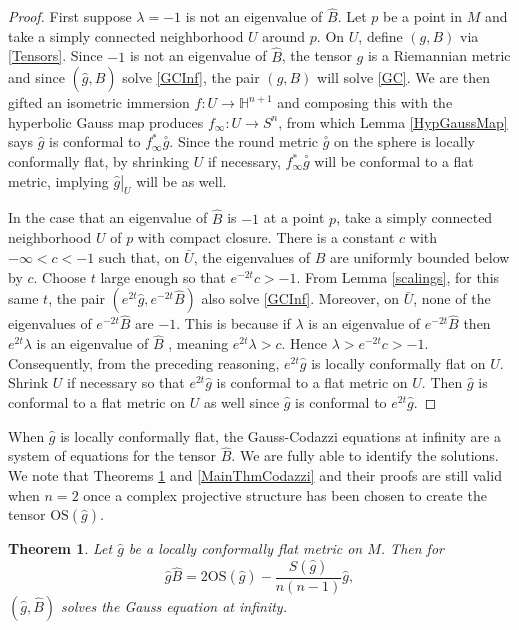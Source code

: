 \documentclass{amsart}
\newtheorem{thm}{Theorem}[section]
\numberwithin{equation}{section}
\renewcommand{\H}{\mathbb{H}}
\begin{document}
\begin{proof}
First suppose $\lambda = -1$ is not an eigenvalue of $\hat{B}$.
Let $p$ be a point in $M$ and take a simply connected neighborhood $U$ around $p$.
On $U$, define $(g,B)$ via \eqref{Tensors}.
Since $-1$ is not an eigenvalue of $\hat{B}$, the tensor $g$ is a Riemannian metric and since $(\hat{g},\hat{B})$ solve \ref{GCInf}, the pair $(g,B)$ will solve \ref{GC}.
We are then gifted an isometric immersion $f: U \to \H^{n+1}$ and composing this with the hyperbolic Gauss map produces $f_\infty:U \to S^n$, from which Lemma \ref{HypGaussMap} says $\hat{g}$ is conformal to $f_\infty^*\overset{\circ}{g}$.
Since the round metric $\overset{\circ}{g}$ on the sphere is locally conformally flat, by shrinking $U$ if necessary, $f_\infty^*\overset{\circ}{g}$ will be conformal to a flat metric, implying $\left.\hat{g}\right|_{U}$ will be as well. 

In the case that an eigenvalue of $\hat{B}$ is $-1$ at a point $p$, take a simply connected neighborhood $U$ of $p$ with compact closure.
There is a constant $c$ with $-\infty < c < -1$ such that, on $\bar{U}$, the eigenvalues of $\hat{B}$ are uniformly bounded below by $c$. 
Choose $t$ large enough so that $e^{-2t}c > -1$. 
From Lemma \ref{scalings}, for this same $t$, the pair $(e^{2t}\hat{g},e^{-2t}\hat{B})$ also solve \ref{GCInf}. 
Moreover, on $\bar{U}$, none of the eigenvalues of $e^{-2t}\hat{B}$ are $-1$. 
This is because if $\lambda$ is an eigenvalue of $e^{-2t}\hat{B}$ then $e^{2t}\lambda$ is an eigenvalue of $\hat{B}$ , meaning $e^{2t}\lambda > c$.
Hence $\lambda > e^{-2t}c > -1$.
Consequently, from the preceding reasoning, $e^{2t}\hat{g}$ is locally conformally flat on $U$.
Shrink $U$ if necessary so that $e^{2t}\hat{g}$ is conformal to a flat metric on $U$. 
Then $\hat{g}$ is conformal to a flat metric on $U$ as well since $\hat{g}$ is conformal to $e^{2t}\hat{g}$.
\end{proof}

When $\hat{g}$ is locally conformally flat, the Gauss-Codazzi equations at infinity are a system of equations for the tensor $\hat{B}$.
We are fully able to identify the solutions.
We note that Theorems \ref{MainThmGauss} and \ref{MainThmCodazzi} and their proofs are still valid when $n = 2$ once a complex projective structure has been chosen to create the tensor $\mathrm{OS}(\hat{g})$.


\begin{thm}
\label{MainThmGauss}
Let $\hat{g}$ be a locally conformally flat metric on $M$. Then for 
\[
\hat{g} \hat{B} = 2\mathrm{OS}(\hat{g}) - \frac{S(\hat{g})}{n(n-1)}\hat{g},
\]
$(\hat{g},\hat{B})$ solves the Gauss equation at infinity.
\end{thm}
\end{document}
